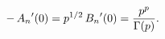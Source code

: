 \[-\mathop{A_{n}\/}\nolimits'\!\left(0\right)=p^{1/2}\mathop{B_{n}\/}\nolimits'%
\!\left(0\right)=\frac{p^{p}}{\mathop{\Gamma\/}\nolimits\!\left(p\right)}.\]